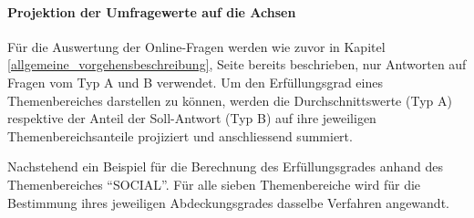 \documentclass[../../main.tex]{subfiles}
\begin{document}
\paragraph*{Projektion der Umfragewerte auf die Achsen}\mbox{}

\begin{sloppypar}
Für die Auswertung der Online-Fragen werden wie zuvor in Kapitel \ref{allgemeine_vorgehensbeschreibung}, Seite \pageref{allgemeine_vorgehensbeschreibung} bereits beschrieben, nur Antworten auf Fragen vom Typ A und B verwendet. Um den Erfüllungsgrad eines Themenbereiches darstellen zu können, werden die Durchschnittswerte (Typ A) respektive der Anteil der Soll-Antwort (Typ B) auf ihre jeweiligen Themenbereichsanteile projiziert und anschliessend summiert. 
\end{sloppypar}

\newpage

\begin{sloppypar}
Nachstehend ein Beispiel für die Berechnung des Erfüllungsgrades anhand des Themenbereiches "`SOCIAL"'. Für alle sieben Themenbereiche wird für die Bestimmung ihres jeweiligen Abdeckungsgrades dasselbe Verfahren angewandt.\footnotemark
\end{sloppypar}


\end{document}
